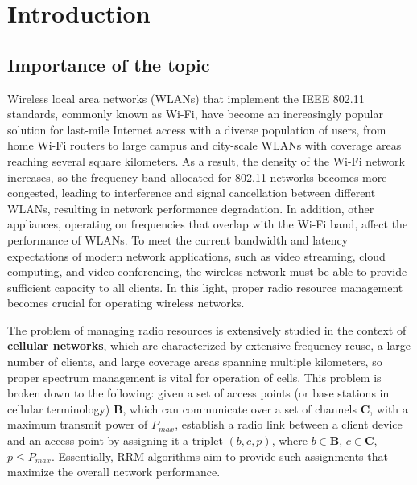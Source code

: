 \chapter{Introduction}
\label{chap:intro}
\chaptermark{}

\section{Importance of the topic}

Wireless local area networks (WLANs) that implement the IEEE 802.11 standards, commonly known as Wi-Fi, have become an increasingly popular solution for last-mile Internet access with a diverse population of users, from home Wi-Fi routers to large campus and city-scale WLANs with coverage areas reaching several square kilometers.
As a result, the density of the Wi-Fi network increases, so the frequency band allocated for 802.11 networks becomes more congested, leading to interference and signal cancellation between different WLANs, resulting in network performance degradation.
In addition, other appliances, operating on frequencies that overlap with the Wi-Fi band, affect the performance of WLANs.
To meet the current bandwidth and latency expectations of modern network applications, such as video streaming, cloud computing, and video conferencing, the wireless network must be able to provide sufficient capacity to all clients. In this light, proper radio resource management becomes crucial for operating wireless networks.

The problem of managing radio resources is extensively studied in the context of \textbf{cellular networks}, which are characterized by extensive frequency reuse, a large number of clients, and large coverage areas spanning multiple kilometers, so proper spectrum management is vital for operation of cells. This problem is broken down to the following: given a set of access points (or base stations in cellular terminology) $\boldsymbol{B}$, which can communicate over a set of channels $\boldsymbol{C}$, with a maximum transmit power of $P_{max}$, establish a radio link between a client device and an access point by assigning it a triplet $(b, c, p)$, where $b \in \boldsymbol{B}$, $c \in \boldsymbol{C}$, $p \leq P_{max}$.
Essentially, RRM algorithms aim to provide such assignments that maximize the overall network performance.
